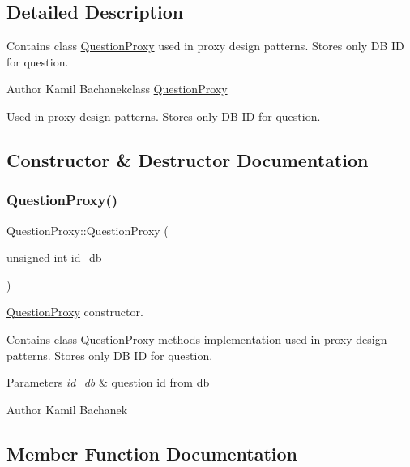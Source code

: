 \subsection{Detailed Description}
Contains class \hyperlink{class_question_proxy}{Question\+Proxy} used in proxy design patterns. Stores only DB ID for question. 

\begin{DoxyAuthor}{Author}
Kamil Bachanekclass \hyperlink{class_question_proxy}{Question\+Proxy}
\end{DoxyAuthor}
Used in proxy design patterns. Stores only DB ID for question. 

\subsection{Constructor \& Destructor Documentation}
\mbox{\label{class_question_proxy_a68b0fb83effeb190d956bcc898ced585}} 
\subsubsection{\texorpdfstring{Question\+Proxy()}{QuestionProxy()}}
{\footnotesize\ttfamily Question\+Proxy\+::\+Question\+Proxy (\begin{DoxyParamCaption}\item[{unsigned int}]{id\+\_\+db }\end{DoxyParamCaption})}



\hyperlink{class_question_proxy}{Question\+Proxy} constructor. 

Contains class \hyperlink{class_question_proxy}{Question\+Proxy} methods implementation used in proxy design patterns. Stores only DB ID for question.


\begin{DoxyParams}{Parameters}
{\em id\+\_\+db} & question id from db\\
\hline
\end{DoxyParams}
\begin{DoxyAuthor}{Author}
Kamil Bachanek 
\end{DoxyAuthor}


\subsection{Member Function Documentation}
\mbox{\label{class_question_proxy_aaea03e52cf7e3f9d19d59134e88d6df0}} 
